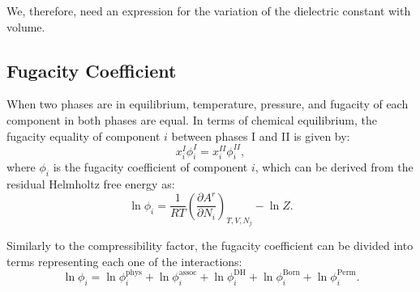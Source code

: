 We, therefore, need an expression for the variation of the dielectric constant with volume.

\subsection{Fugacity Coefficient}
When two phases are in equilibrium, temperature, pressure, and fugacity of each component in both phases are equal. In terms of chemical equilibrium, the fugacity equality of component $i$ between phases I and II is given by:
\begin{equation}
     x_i^{I}\phi_i^I = x_i^{II}\phi_i^{II},
    \label{Eq:xPHIxPHI}
\end{equation}
where $\phi_i$ is the fugacity coefficient of component $i$, which can be derived from the residual Helmholtz free energy as:
\begin{equation}
     \ln{\phi_i} =   \frac{1}{RT}\left (  \frac{\partial A^r}{\partial N_i} \right )_{T,V,N_j} - \ln{Z}.
    \label{Eq:lnPHI}
\end{equation} 

Similarly to the compressibility factor, the fugacity coefficient can be divided into terms representing each one of the interactions:
\begin{equation}
    \ln{\phi_i} = \ln{\phi_i^\text{phys}} + \ln{\phi_i^\text{assoc}}  + \ln{\phi_i^\text{DH}}  + \ln{\phi_i^\text{Born}}  + \ln{\phi_i^\text{Perm}}.
    \label{Eq:eCPA_phi}
\end{equation}

